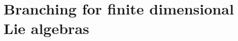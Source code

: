 \documentclass[12pt]{iopart}
\theoremstyle{definition}
\begin{document}
\section{Branching for finite dimensional Lie algebras}
\label{sec:finite-dimens-lie}
\end{document}
